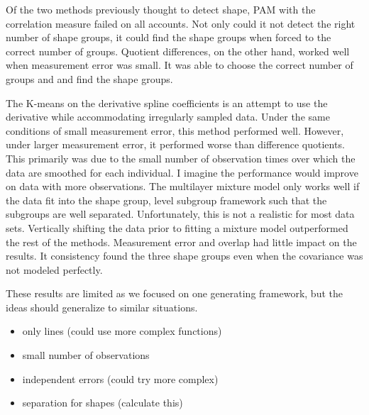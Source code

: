 Of the two methods previously thought to detect shape, PAM with the correlation measure failed on all accounts. Not only could it not detect the right number of shape groups, it could find the shape groups when forced to the correct number of groups. Quotient differences, on the other hand, worked well when measurement error was small. It was able to choose the correct number of groups and and find the shape groups.


The K-means on the derivative spline coefficients is an attempt to use the derivative while accommodating irregularly sampled data. Under the same conditions of small measurement error, this method performed well. However, under larger measurement error, it performed worse than difference quotients. This primarily was due to the small number of observation times over which the data are smoothed for each individual. I imagine the performance would improve on data with more observations.  The multilayer mixture model only works well if the data fit into the shape group, level subgroup framework such that the subgroups are well separated. Unfortunately, this is not a realistic for most data sets. Vertically shifting the data prior to fitting a mixture model outperformed the rest of the methods. Measurement error and overlap had little impact on the results. It consistency found the three shape groups even when the covariance was not modeled perfectly.

These results are limited as we focused on one generating framework, but the ideas should generalize to similar situations. 
\begin{itemize}
\item only lines (could use more complex functions) 
\item small number of observations 
\item independent errors (could try more complex)
\item separation for shapes (calculate this)
\end{itemize}


